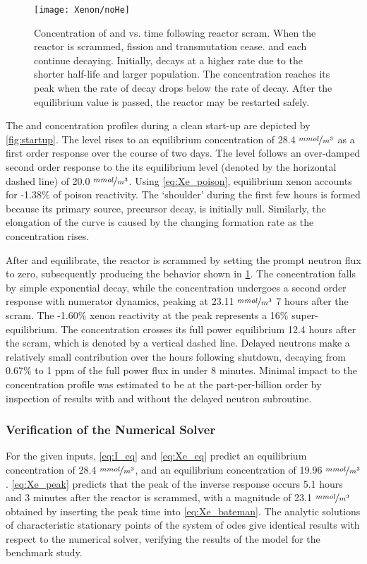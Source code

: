 \begin{figure}[ht!]
    \centering
    \texttt{[image: Xenon/noHe]}
    \caption[Concentration of \I and \Xe vs. time following reactor scram]{Concentration of \I and \Xe vs. time following reactor scram. When the reactor is scrammed, fission and transmutation cease. \I and \Xe each continue decaying. Initially, \I decays at a higher rate due to the shorter half-life and larger population. The \Xe concentration reaches its peak when the rate of \I decay drops below the rate of \Xe decay. After the equilibrium value is passed, the reactor may be restarted safely.}
    \label{fig:Control}
\end{figure}

The \Xe and \I concentration profiles during a clean start-up are depicted by \cref{fig:startup}. The \I level rises to an equilibrium concentration of 28.4 $\nicefrac{mmol}{m^3}$ as a first order response over the course of two days. The \Xe level follows an over-damped second order response to the its equilibrium level (denoted by the horizontal dashed line) of 20.0 $\nicefrac{mmol}{m^3}$. Using \ref{eq:Xe_poison}, equilibrium xenon accounts for -1.38\% of poison reactivity. The `shoulder' during the first few hours is formed because its primary source, precursor decay, is initially null. Similarly, the elongation of the curve is caused by the changing formation rate as the \I concentration rises. 

After \I and \Xe equilibrate, the reactor is scrammed by setting the prompt neutron flux to zero, subsequently producing the behavior shown in  \cref{fig:Control}. The \I concentration falls by simple exponential decay, while the \Xe concentration undergoes a second order response with numerator dynamics, peaking at 23.11 $\nicefrac{mmol}{m^3}$ 7 hours after the scram. The -1.60\% xenon reactivity at the peak represents a 16\% super-equilibrium. The \Xe concentration crosses its full power equilibrium 12.4 hours after the scram, which is denoted by a vertical dashed line. Delayed neutrons make a relatively small contribution over the hours following shutdown, decaying from 0.67\% to 1 ppm of the full power flux in under 8 minutes. Minimal impact to the \Xe concentration profile was estimated to be at the part-per-billion order by inspection of results with and without the delayed neutron subroutine.

\subsubsection{Verification of the Numerical Solver} 
For the given inputs, \ref{eq:I_eq} and \ref{eq:Xe_eq} predict an equilibrium \I concentration of 28.4 $\nicefrac{mmol}{m^3}$, and an equilibrium \Xe concentration of 19.96 $\nicefrac{mmol}{m^3}$. \ref{eq:Xe_peak} predicts that the peak of the inverse response occurs 5.1 hours and 3 minutes after the reactor is scrammed, with a magnitude of 23.1 $\nicefrac{mmol}{m^3}$ obtained by inserting the peak time into \ref{eq:Xe_bateman}. The analytic solutions of characteristic stationary points of the system of \acsp{ode} give identical results with respect to the numerical solver, verifying the results of the model for the benchmark study.

